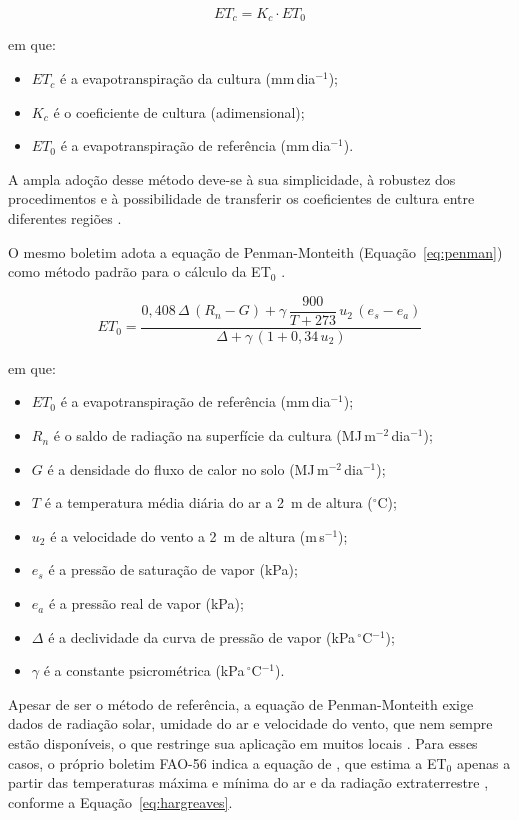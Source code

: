 \begin{equation}
  ET_c = K_c \cdot ET_0
  \label{eq:etc}
\end{equation}

\noindent em que:
\begin{itemize}
  \item $ET_c$ é a evapotranspiração da cultura (mm\,dia$^{-1}$);
  \item $K_c$ é o coeficiente de cultura (adimensional);
  \item $ET_0$ é a evapotranspiração de referência (mm\,dia$^{-1}$).
\end{itemize}
 
A ampla adoção desse método deve-se à sua simplicidade, à robustez dos procedimentos e à possibilidade de transferir os coeficientes de cultura entre diferentes regiões \cite{pereira2015}.
 
O mesmo boletim adota a equação de Penman-Monteith
(Equação~\ref{eq:penman}) como método padrão para o cálculo da ET$_0$
\cite{allen1998}.
 
\begin{equation}
  ET_0 = \frac{0{,}408\,\Delta\,(R_n - G) + \gamma\,\dfrac{900}{T + 273}\,u_2\,(e_s - e_a)}
              {\Delta + \gamma\,(1 + 0{,}34\,u_2)}
  \label{eq:penman}
\end{equation}
 
\noindent em que:
\begin{itemize}
  \item $ET_0$ é a evapotranspiração de referência (mm\,dia$^{-1}$);
  \item $R_n$ é o saldo de radiação na superfície da cultura (MJ\,m$^{-2}$\,dia$^{-1}$);
  \item $G$ é a densidade do fluxo de calor no solo (MJ\,m$^{-2}$\,dia$^{-1}$);
  \item $T$ é a temperatura média diária do ar a 2~m de altura ($^{\circ}$C);
  \item $u_2$ é a velocidade do vento a 2~m de altura (m\,s$^{-1}$);
  \item $e_s$ é a pressão de saturação de vapor (kPa);
  \item $e_a$ é a pressão real de vapor (kPa);
  \item $\Delta$ é a declividade da curva de pressão de vapor (kPa\,$^{\circ}$C$^{-1}$);
  \item $\gamma$ é a constante psicrométrica (kPa\,$^{\circ}$C$^{-1}$).
\end{itemize}
 
Apesar de ser o método de referência, a equação de Penman-Monteith exige dados
de radiação solar, umidade do ar e velocidade do vento, que nem sempre estão
disponíveis, o que restringe sua aplicação em muitos locais
\cite{venancio2019}. Para esses casos, o próprio boletim FAO-56 indica a
equação de , que estima a ET$_0$ apenas a partir das
temperaturas máxima e mínima do ar e da radiação extraterrestre
\cite{allen1998}, conforme a Equação~\ref{eq:hargreaves}.
 
